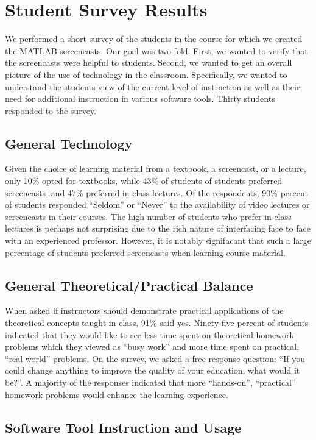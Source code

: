 \documentclass[a4paper,10pt]{article}
\begin{document}
\section{Student Survey Results}
We performed a short survey of the students in the course for which we created the MATLAB screencasts. Our goal was two fold. First, we wanted to verify that the screencasts were helpful to students. Second, we wanted to get an overall picture of the use of technology in the classroom. Specifically, we wanted to understand the students view of the current level of instruction as well as their need for additional instruction in various software tools. Thirty students responded to the survey.

\subsection{General Technology}
Given the choice of learning material from a textbook, a screencast, or a lecture, only 10\% opted for textbooks, while 43\% of students of students preferred screencasts, and 47\% preferred in class lectures. Of the respondents, 90\% percent of students responded ``Seldom'' or ``Never'' to the availability of video lectures or screencasts in their courses. The high number of students who prefer in-class lectures is perhaps not surprising due to the rich nature of interfacing face to face with an experienced professor.  However, it is notably signifacant that such a large percentage of students preferred screencasts when learning course material.

\subsection{General Theoretical/Practical Balance}
When asked if instructors should demonstrate practical applications of the theoretical concepts taught in class, 91\% said yes. Ninety-five percent of students indicated that they would like to see less time spent on theoretical homework problems which they viewed as ``busy work'' and more time spent on practical, ``real world'' problems. On the survey, we asked a free response question: ``If you could change anything to improve the quality of your education, what would it be?''. A majority of the responses indicated that more ``hands-on'', ``practical'' homework problems would enhance the learning experience.

\subsection{Software Tool Instruction and Usage}
\end{document}
